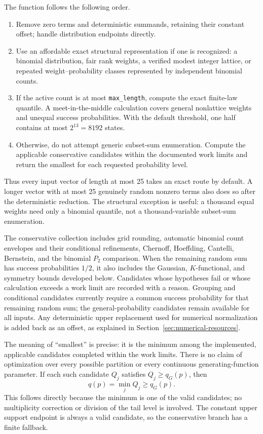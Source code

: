 \documentclass[11pt,letterpaper]{article}
\numberwithin{equation}{section}
\theoremstyle{definition}
\theoremstyle{remark}
\begin{document}
The function follows the following order.
\begin{enumerate}
\item Remove zero terms and deterministic summands, retaining their
constant offset; handle distribution endpoints directly.
\item Use an affordable exact structural representation if one is
recognized: a binomial distribution, fair rank weights, a verified modest
integer lattice, or repeated weight--probability classes represented by
independent binomial counts.
\item If the active count is at most \texttt{max\_length}, compute the
exact finite-law quantile. A meet-in-the-middle calculation covers general
nonlattice weights and unequal success probabilities. With the default
threshold, one half contains at most $2^{13}=8192$ states.
\item Otherwise, do not attempt generic subset-sum enumeration. Compute
the applicable conservative candidates within the documented work limits
and return the smallest for each requested probability level.
\end{enumerate}
Thus every input vector of length at most 25 takes an exact route by
default. A longer vector with at most 25 genuinely random nonzero terms
also does so after the deterministic reduction. The structural exception
is useful: a thousand equal weights need only a binomial quantile,
not a thousand-variable subset-sum enumeration.

The conservative collection includes grid rounding, automatic binomial
count envelopes and their conditional refinements, Chernoff, Hoeffding,
Cantelli, Bernstein, and the binomial $P_2$ comparison. When the remaining
random sum has success probabilities $1/2$, it also includes the Gaussian,
$K$-functional, and symmetry bounds developed below. Candidates whose
hypotheses fail or whose calculation exceeds a work limit are recorded
with a reason. Grouping and conditional candidates currently require a
common success probability for that remaining random sum; the
general-probability candidates remain available for all inputs. Any
deterministic upper replacement used for numerical normalization is added
back as an offset, as explained in Section~\ref{sec:numerical-resources}.

The meaning of ``smallest'' is precise: it is the minimum among the
implemented, applicable candidates completed within the work limits.
There is no claim of optimization over every possible partition or every
continuous generating-function parameter. If each such candidate $Q_j$
satisfies $Q_j\ge q_G(p)$, then
\begin{equation}
  \widehat q(p)=\min_j Q_j\ge q_G(p).
  \label{eq:unified-minimum}
\end{equation}
This follows directly because the minimum is one of the valid candidates;
no multiplicity correction or division of the tail level is involved.
The constant upper support endpoint is always a valid candidate, so the
conservative branch has a finite fallback.
\end{document}
